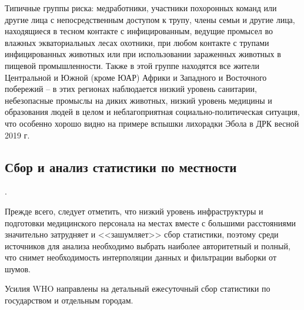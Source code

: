 Типичные группы риска: медработники, участники похоронных команд или другие лица с непосредственным доступом к трупу, члены семьи и другие лица, находящиеся в тесном контакте с инфицированным, ведущие промысел во влажных экваториальных лесах охотники, при любом контакте с трупами инфицированных животных или при использовании зараженных животных в пищевой промышленности. Также в этой группе находятся все жители Центральной и  Южной (кроме ЮАР) Африки  и Западного и Восточного  побережий -- в этих регионах наблюдается низкий уровень санитарии, небезопасные промыслы на диких животных, низкий уровень медицины и образования людей в целом и неблагоприятная социально-политическая ситуация, что особенно хорошо видно на примере вспышки лихорадки Эбола в ДРК весной 2019 г.


\subsection{Сбор  и анализ статистики по местности}.

Прежде всего, следует отметить, что низкий уровень инфраструктуры и подготовки медицинского персонала на местах вместе с большими расстояниями значительно затрудняет и <<зашумляет>> сбор статистики, поэтому среди источников для анализа необходимо выбрать наиболее авторитетный и полный, что снимет необходимость интерполяции данных и фильтрации выборки от шумов.


Усилия WHO направлены на детальный ежесуточный сбор статистики по государством и отдельным городам. 

